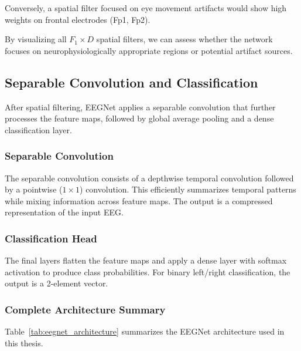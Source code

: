Conversely, a spatial filter focused on eye movement artifacts would show high weights on frontal electrodes (Fp1, Fp2).

By visualizing all $F_1 \times D$ spatial filters, we can assess whether the network focuses on neurophysiologically appropriate regions or potential artifact sources.


\subsection{Separable Convolution and Classification}
\label{subsec:bg_eegnet_separable}

After spatial filtering, EEGNet applies a separable convolution that further processes the feature maps, followed by global average pooling and a dense classification layer.

\subsubsection{Separable Convolution}

The separable convolution consists of a depthwise temporal convolution followed by a pointwise ($1 \times 1$) convolution. This efficiently summarizes temporal patterns while mixing information across feature maps. The output is a compressed representation of the input EEG.

\subsubsection{Classification Head}

The final layers flatten the feature maps and apply a dense layer with softmax activation to produce class probabilities. For binary left/right classification, the output is a 2-element vector.

\subsubsection{Complete Architecture Summary}

Table~\ref{tab:eegnet_architecture} summarizes the EEGNet architecture used in this thesis.

